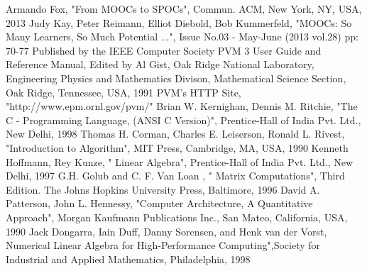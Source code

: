 \begin{thebibliography}{99}
\bibitem{}Armando Fox, "From MOOCs to SPOCs", Commun. ACM, New York, NY, USA, 2013 
\bibitem{}Judy Kay, Peter Reimann, Elliot Diebold, Bob Kummerfeld, "MOOCs: So Many Learners, So Much Potential ...", Issue No.03 - May-June (2013 vol.28)
pp: 70-77
Published by the IEEE Computer Society 
\bibitem{}PVM 3 User Guide and Reference Manual, Edited by Al Gist, Oak Ridge National Laboratory, Engineering Physics and Mathematics Divison,
Mathematical Science Section, Oak Ridge, Tennessee, USA, 1991
\bibitem{}PVM's HTTP Site, "http://www.epm.ornl.gov/pvm/"
\bibitem{}Brian W. Kernighan, Dennis M. Ritchie, "The C - Programming Language, (ANSI C Version)", Prentice-Hall of India Pvt. Ltd., New Delhi, 1998
\bibitem{}Thomas H. Corman, Charles E. Leiserson, Ronald L. Rivest, "Introduction to Algorithm", MIT Press, Cambridge, MA, USA, 1990
\bibitem{}Kenneth Hoffmann, Rey Kunze, " Linear Algebra", Prentice-Hall of India Pvt. Ltd., New Delhi, 1997
\bibitem{}G.H. Golub and C. F. Van Loan , " Matrix Computations", Third Edition. The Johns Hopkins University Press, Baltimore, 1996
\bibitem{}David A. Patterson, John L. Hennessy, "Computer Architecture, A Quantitative Approach", Morgan Kaufmann Publications Inc., San Mateo, California,
USA, 1990
\bibitem{}Jack Dongarra, Iain Duff, Danny Sorensen, and Henk van der Vorst, Numerical Linear Algebra for High-Performance Computing",Society for Industrial and
Applied Mathematics, Philadelphia, 1998
\end{thebibliography}